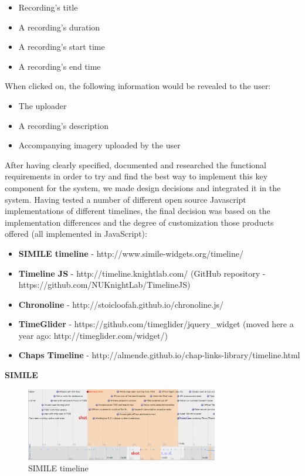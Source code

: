 \documentclass{l3proj}
\begin{document}
\begin{itemize}
\item{Recording's title}
\item{A recording's duration}
\item{A recording's start time}
\item{A recording's end time}
\end{itemize}

When clicked on, the following information would be revealed to the user:
\begin{itemize}
\item{The uploader}
\item{A recording's description}
\item{Accompanying imagery uploaded by the user}
\end{itemize}

After having clearly specified, documented and researched the functional requirements in order to try and find the best way to implement this key component for the system, we made design decisions and integrated it in the system. Having tested a number of different open source Javascript implementations of different timelines, the final decision was based on the implementation differences and the degree of customization those products offered (all implemented in JavaScript):


\begin{itemize}


\item{\textbf{SIMILE timeline} - http://www.simile-widgets.org/timeline/}

\item{\textbf{Timeline JS} - http://timeline.knightlab.com/ (GitHub repository - https://github.com/NUKnightLab/TimelineJS)}

\item{\textbf{Chronoline} - http://stoicloofah.github.io/chronoline.js/}

\item{\textbf{TimeGlider} - https://github.com/timeglider/jquery_widget (moved here a year ago: http://timeglider.com/widget/)}

\item{\textbf{Chaps Timeline} - http://almende.github.io/chap-links-library/timeline.html}


\end{itemize}


\textbf{SIMILE}

\begin{figure}[ht!]
  \centering
\includegraphics[width=0.75\textwidth]{images/SIMILE.png}
\caption{SIMILE timeline}
\end{figure}
\end{document}

